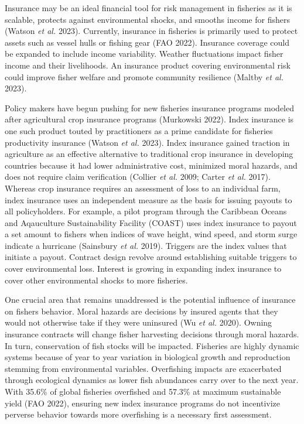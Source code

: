 \documentclass[
  letterpaper,
  DIV=11,
  numbers=noendperiod]{scrartcl}
\theoremstyle{plain}
\theoremstyle{plain}
\theoremstyle{remark}
\begin{document}
Insurance may be an ideal financial tool for risk management in
fisheries as it is scalable, protects against environmental shocks, and
smooths income for fishers (Watson \emph{et al.} 2023). Currently,
insurance in fisheries is primarily used to protect assets such as
vessel hulls or fishing gear (FAO 2022). Insurance coverage could be
expanded to include income variability. Weather fluctuations impact
fisher income and their livelihoods. An insurance product covering
environmental risk could improve fisher welfare and promote community
resilience (Maltby \emph{et al.} 2023).

Policy makers have begun pushing for new fisheries insurance programs
modeled after agricultural crop insurance programs (Murkowski 2022).
Index insurance is one such product touted by practitioners as a prime
candidate for fisheries productivity insurance (Watson \emph{et al.}
2023). Index insurance gained traction in agriculture as an effective
alternative to traditional crop insurance in developing countries
because it had lower administrative cost, minimized moral hazards, and
does not require claim verification (Collier \emph{et al.} 2009; Carter
\emph{et al.} 2017). Whereas crop insurance requires an assessment of
loss to an individual farm, index insurance uses an independent measure
as the basis for issuing payouts to all policyholders. For example, a
pilot program through the Caribbean Oceans and Aqauculture
Sustainability Facility (COAST) uses index insurance to payout a set
amount to fishers when indices of wave height, wind speed, and storm
surge indicate a hurricane (Sainsbury \emph{et al.} 2019). Triggers are
the index values that initiate a payout. Contract design revolve around
establishing suitable triggers to cover environmental loss. Interest is
growing in expanding index insurance to cover other environmental shocks
to more fisheries.

One crucial area that remains unaddressed is the potential influence of
insurance on fishers behavior. Moral hazards are decisions by insured
agents that they would not otherwise take if they were uninsured (Wu
\emph{et al.} 2020). Owning insurance contracts will change fisher
harvesting decisions through moral hazards. In turn, conservation of
fish stocks will be impacted. Fisheries are highly dynamic systems
because of year to year variation in biological growth and reproduction
stemming from environmental variables. Overfishing impacts are
exacerbated through ecological dynamics as lower fish abundances carry
over to the next year. With 35.6\% of global fisheries overfished and
57.3\% at maximum sustainable yield (FAO 2022), ensuring new index
insurance programs do not incentivize perverse behavior towards more
overfishing is a necessary first assessment.
\end{document}

